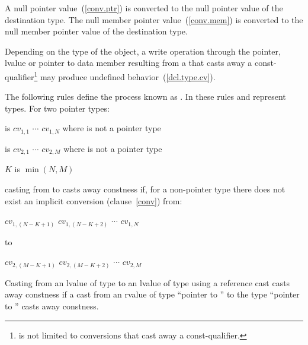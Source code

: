 \pnum
A null pointer value~(\ref{conv.ptr}) is converted to the null pointer
value of the destination type. The null member pointer
value~(\ref{conv.mem}) is converted to the null member pointer value of
the destination type.

\pnum
\enternote 
Depending on the type of the object, a write operation through the
pointer, lvalue or pointer to data member resulting from a
 that casts away a const-qualifier\footnote{
is not limited to conversions that cast away a
const-qualifier.}
may produce undefined behavior~(\ref{dcl.type.cv}).
\exitnote 

\pnum
The following rules define the process known as . In these rules  and 
represent types. For two pointer types:

\begin{indented}
 is $\mathit{cv}_{1,1}$ \tcode{*} $\cdots$
$\mathit{cv}_{1,N}$ \tcode{*} where  is not a pointer type
\end{indented}

\begin{indented}
 is $\mathit{cv}_{2,1}$ \tcode{*} $\cdots$
$\mathit{cv}_{2,M}$ \tcode{*} where  is not a pointer type
\end{indented}

\begin{indented}
$K$ is $\min (N,M)$
\end{indented}

casting from  to  casts away constness if, for a
non-pointer type  there does not exist an implicit conversion
(clause~\ref{conv}) from:

\begin{indented}
$\mathit{cv}_{1,(N-K+1)}$ \tcode{*} $\mathit{cv}_{1,(N-K+2)}$
\tcode{*} $\cdots$ $\mathit{cv}_{1,N}$ \tcode{*}
\end{indented}

to

\begin{indented}
$\mathit{cv}_{2,(M-K+1)}$ \tcode{*} $\mathit{cv}_{2,(M-K+2)}$
\tcode{*} $\cdots$ $\mathit{cv}_{2,M}$ \tcode{*}
\end{indented}

\pnum
Casting from an lvalue of type  to an lvalue of type
 using a reference cast casts away constness if a cast
from an rvalue of type ``pointer to '' to the type ``pointer to
'' casts away constness.

